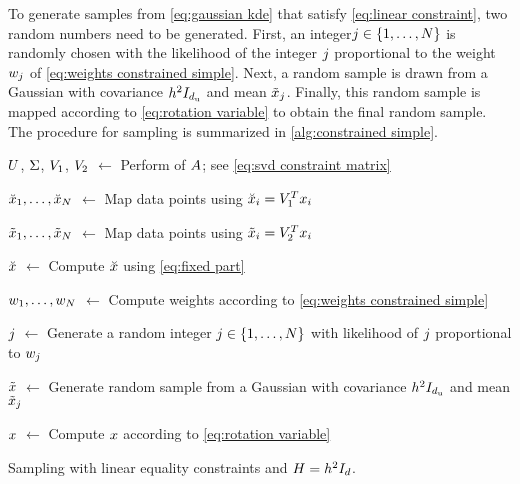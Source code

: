 To generate samples from \cref{eq:gaussian kde} that satisfy \cref{eq:linear constraint}, two random numbers need to be generated. 
First, an integer$j\in\{1,\ldots,N\}$ is randomly chosen with the likelihood of the integer $j$ proportional to the weight $w_{j}$ of \cref{eq:weights constrained simple}. 
Next, a random sample is drawn from a Gaussian with covariance $h^2 I_{d_\mathrm{u}}$ and mean $\tilde{x}_{j}$.
Finally, this random sample is mapped according to \cref{eq:rotation variable} to obtain the final random sample.
The procedure for sampling is summarized in \cref{alg:constrained simple}.

\begin{algorithm}[t]
	
	$U$, $\Sigma$, $V_1$, $V_2$ $\gets$ Perform  of $A$; see \cref{eq:svd constraint matrix}
	
	$\breve{x}_{1},\ldots,\breve{x}_{N}$ $\gets$ Map data points using $\breve{x}_{i} = V_1^T x_{i}$
		
	$\tilde{x}_{1},\ldots,\tilde{x}_{N}$ $\gets$ Map data points using $\tilde{x}_{i} = V_2^T x_{i}$
	
	$\breve{x}$ $\gets$ Compute $\breve{x}$ using \cref{eq:fixed part}
	
	$w_{1},\ldots,w_{N}$ $\gets$ Compute weights according to \cref{eq:weights constrained simple}
	
	$j$ $\gets$ Generate a random integer $j\in\{1,\ldots,N\}$ with likelihood of $j$ proportional to $w_{j}$
	
	$\tilde{x}$ $\gets$ Generate random sample from a Gaussian with covariance $h^2 I_{d_\mathrm{u}}$ and mean $\tilde{x}_{j}$
	
	$x$ $\gets$ Compute $x$ according to \cref{eq:rotation variable}
		
	\caption{Sampling with linear equality constraints and $H=h^2 I_{d}$.}
	\label{alg:constrained simple}
\end{algorithm}



